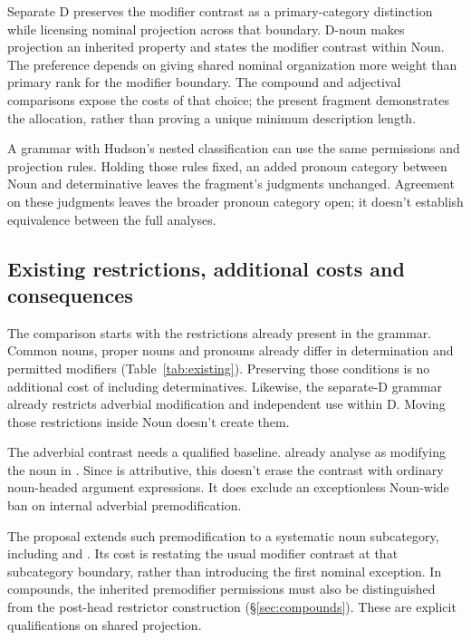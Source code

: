 \documentclass[12pt]{article}
\begin{document}
Separate D preserves the modifier contrast as a primary-category distinction while licensing nominal projection across that boundary. D-noun makes projection an inherited property and states the modifier contrast within Noun. The preference depends on giving shared nominal organization more weight than primary rank for the modifier boundary. The compound and adjectival comparisons expose the costs of that choice; the present fragment demonstrates the allocation, rather than proving a unique minimum description length.

A grammar with Hudson's nested classification can use the same permissions and projection rules. Holding those rules fixed, an added pronoun category between Noun and determinative leaves the fragment's judgments unchanged. Agreement on these judgments leaves the broader pronoun category open; it doesn't establish equivalence between the full analyses.

\subsection{Existing restrictions, additional costs and consequences}\label{sec:costs}

The comparison starts with the restrictions already present in the grammar. Common nouns, proper nouns and pronouns already differ in determination and permitted modifiers (Table~\ref{tab:existing}). Preserving those conditions is no additional cost of including determinatives. Likewise, the separate-D grammar already restricts adverbial modification and independent use within D. Moving those restrictions inside Noun doesn't create them.

The adverbial contrast needs a qualified baseline. \textcite[75, n.~3]{payne2010} already analyse  as modifying the noun  in . Since  is attributive, this doesn't erase the contrast with ordinary noun-headed argument expressions. It does exclude an exceptionless Noun-wide ban on internal adverbial premodification.

The proposal extends such premodification to a systematic noun subcategory, including  and . Its cost is restating the usual modifier contrast at that subcategory boundary, rather than introducing the first nominal exception. In compounds, the inherited premodifier permissions must also be distinguished from the post-head restrictor construction (§\ref{sec:compounds}). These are explicit qualifications on shared projection.
\end{document}
